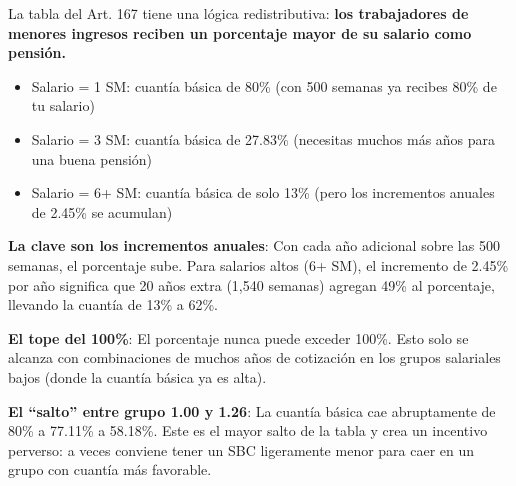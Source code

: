 \documentclass[11pt,a4paper]{report}
\begin{document}
\begin{tcolorbox}[colback=green!5!white, colframe=green!50!black, title=\textbf{Intuici\'on}]
La tabla del Art. 167 tiene una l\'ogica redistributiva: \textbf{los trabajadores de menores ingresos reciben un porcentaje mayor de su salario como pensi\'on.}

\begin{itemize}[nosep]
\item Salario = 1 SM: cuant\'ia b\'asica de 80\% (con 500 semanas ya recibes 80\% de tu salario)
\item Salario = 3 SM: cuant\'ia b\'asica de 27.83\% (necesitas muchos m\'as a\~nos para una buena pensi\'on)
\item Salario = 6+ SM: cuant\'ia b\'asica de solo 13\% (pero los incrementos anuales de 2.45\% se acumulan)
\end{itemize}

\textbf{La clave son los incrementos anuales}: Con cada a\~no adicional sobre las 500 semanas, el porcentaje sube. Para salarios altos (6+ SM), el incremento de 2.45\% por a\~no significa que 20 a\~nos extra (1,540 semanas) agregan 49\% al porcentaje, llevando la cuant\'ia de 13\% a 62\%.

\textbf{El tope del 100\%}: El porcentaje nunca puede exceder 100\%. Esto solo se alcanza con combinaciones de muchos a\~nos de cotizaci\'on en los grupos salariales bajos (donde la cuant\'ia b\'asica ya es alta).

\textbf{El ``salto'' entre grupo 1.00 y 1.26}: La cuant\'ia b\'asica cae abruptamente de 80\% a 77.11\% a 58.18\%. Este es el mayor salto de la tabla y crea un incentivo perverso: a veces conviene tener un SBC ligeramente menor para caer en un grupo con cuant\'ia m\'as favorable.
\end{tcolorbox}
\end{document}
